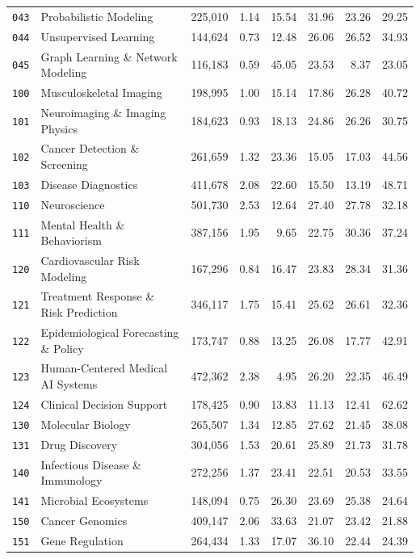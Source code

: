 \begin{longtable}{@{}l l r r r r r r@{}}
\texttt{043} & Probabilistic Modeling & 225,010 & 1.14 & 15.54 & 31.96 & 23.26 & 29.25 \\
\texttt{044} & Unsupervised Learning & 144,624 & 0.73 & 12.48 & 26.06 & 26.52 & 34.93 \\
\texttt{045} & Graph Learning \& Network Modeling & 116,183 & 0.59 & 45.05 & 23.53 & 8.37 & 23.05 \\
\texttt{100} & Musculoskeletal Imaging & 198,995 & 1.00 & 15.14 & 17.86 & 26.28 & 40.72 \\
\texttt{101} & Neuroimaging \& Imaging Physics & 184,623 & 0.93 & 18.13 & 24.86 & 26.26 & 30.75 \\
\texttt{102} & Cancer Detection \& Screening & 261,659 & 1.32 & 23.36 & 15.05 & 17.03 & 44.56 \\
\texttt{103} & Disease Diagnostics & 411,678 & 2.08 & 22.60 & 15.50 & 13.19 & 48.71 \\
\texttt{110} & Neuroscience & 501,730 & 2.53 & 12.64 & 27.40 & 27.78 & 32.18 \\
\texttt{111} & Mental Health \& Behaviorism & 387,156 & 1.95 & 9.65 & 22.75 & 30.36 & 37.24 \\
\texttt{120} & Cardiovascular Risk Modeling & 167,296 & 0.84 & 16.47 & 23.83 & 28.34 & 31.36 \\
\texttt{121} & Treatment Response \& Risk Prediction & 346,117 & 1.75 & 15.41 & 25.62 & 26.61 & 32.36 \\
\texttt{122} & Epidemiological Forecasting \& Policy & 173,747 & 0.88 & 13.25 & 26.08 & 17.77 & 42.91 \\
\texttt{123} & Human-Centered Medical AI Systems & 472,362 & 2.38 & 4.95 & 26.20 & 22.35 & 46.49 \\
\texttt{124} & Clinical Decision Support & 178,425 & 0.90 & 13.83 & 11.13 & 12.41 & 62.62 \\
\texttt{130} & Molecular Biology & 265,507 & 1.34 & 12.85 & 27.62 & 21.45 & 38.08 \\
\texttt{131} & Drug Discovery & 304,056 & 1.53 & 20.61 & 25.89 & 21.73 & 31.78 \\
\texttt{140} & Infectious Disease \& Immunology & 272,256 & 1.37 & 23.41 & 22.51 & 20.53 & 33.55 \\
\texttt{141} & Microbial Ecosystems & 148,094 & 0.75 & 26.30 & 23.69 & 25.38 & 24.64 \\
\texttt{150} & Cancer Genomics & 409,147 & 2.06 & 33.63 & 21.07 & 23.42 & 21.88 \\
\texttt{151} & Gene Regulation & 264,434 & 1.33 & 17.07 & 36.10 & 22.44 & 24.39 \\

\end{longtable}
